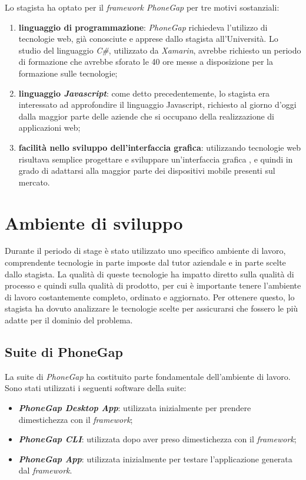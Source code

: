 Lo stagista ha optato per il \textit{framework PhoneGap} per tre motivi sostanziali:
\begin{enumerate}
	\item \textbf{linguaggio di programmazione}: \textit{PhoneGap} richiedeva l'utilizzo di tecnologie web, già conosciute e apprese dallo stagista all'Università. Lo studio del linguaggio \textit{C\#}, utilizzato da \textit{Xamarin}, avrebbe richiesto un periodo di formazione che avrebbe sforato le 40 ore messe a disposizione per la formazione sulle tecnologie;
	\item \textbf{linguaggio \textit{Javascript}}: come detto precedentemente, lo stagista era interessato ad approfondire il linguaggio Javascript, richiesto al giorno d'oggi dalla maggior parte delle aziende che si occupano della realizzazione di applicazioni web;
	\item \textbf{facilità nello sviluppo dell'interfaccia grafica}: utilizzando tecnologie web risultava semplice progettare e sviluppare un'interfaccia grafica , e quindi in grado di adattarsi alla maggior parte dei dispositivi mobile presenti sul mercato.
\end{enumerate}

\section{Ambiente di sviluppo}

Durante il periodo di stage è stato utilizzato uno specifico ambiente di lavoro, comprendente tecnologie in parte imposte dal tutor aziendale e in parte scelte dallo stagista. La qualità di queste tecnologie ha impatto diretto sulla qualità di processo e quindi sulla qualità di prodotto, per cui è importante tenere l'ambiente di lavoro costantemente completo, ordinato e aggiornato. Per ottenere questo, lo stagista ha dovuto analizzare le tecnologie scelte per assicurarsi che fossero le più adatte per il dominio del problema.

\subsection{Suite di PhoneGap}

La suite di \textit{PhoneGap} ha costituito parte fondamentale dell'ambiente di lavoro. Sono stati utilizzati i seguenti software della suite:
\begin{itemize}
	\item \textbf{\textit{PhoneGap Desktop App}}: utilizzata inizialmente per prendere dimestichezza con il \textit{framework};
	\item \textbf{\textit{PhoneGap CLI}}: utilizzata dopo aver preso dimestichezza con il \textit{framework};
	\item \textbf{\textit{PhoneGap App}}: utilizzata inizialmente per testare l'applicazione generata dal \textit{framework}.
\end{itemize}

